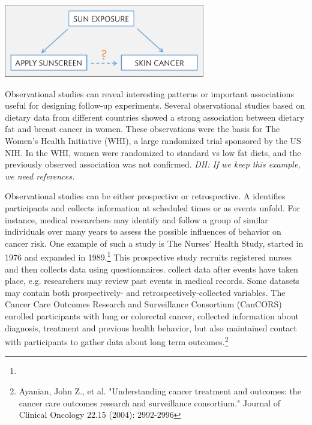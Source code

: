\begin{center}
	\includegraphics[height=1.25in]{ch_intro_to_data_oi_biostat/figures/variables/confoundingVariable.png}
\end{center}

Observational studies can reveal interesting patterns or important associations useful for designing follow-up experiments. Several observational studies based on dietary data from different countries showed a strong association between dietary fat and breast cancer in women.  These observations were the basis for The Women's Health Initiative (WHI), a large randomized trial sponsored by the US NIH.  In the WHI, women were randomized to standard vs low fat diets, and the previously observed association was not confirmed.  \textit{DH: If we keep this example, we need references.}

Observational studies can be either prospective or retrospective. A  identifies participants and collects information at scheduled times or as events unfold. For instance, medical researchers may identify and follow a group of similar individuals over many years to assess the possible influences of behavior on cancer risk. One example of such a study is The Nurses' Health Study, started in 1976 and expanded in 1989.\footnote{\texttt{}} This prospective study recruits registered nurses and then collects data using questionnaires.  collect data after events have taken place, e.g. researchers may review past events in medical records. Some datasets may contain both prospectively- and retrospectively-collected variables. The Cancer Care Outcomes Research and Surveillance Consortium (CanCORS) enrolled participants with lung or colorectal cancer, collected information about diagnosis, treatment and previous health behavior, but also maintained contact with participants to gather data about long term outcomes.\footnote{Ayanian, John Z., et al. "Understanding cancer treatment and outcomes: the cancer care outcomes research and surveillance consortium." Journal of Clinical Oncology 22.15 (2004): 2992-2996}  


